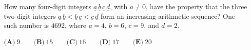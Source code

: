 How many four-digit integers $\underline{a}\,\underline{b}\,\underline{c}\,\underline{d}$, with $a\ne0$, have the property that the three two-digit integers $\underline{a}\,\underline{b}<\underline{b}\,\underline{c}<\underline{c}\,\underline{d}$ form an increasing arithmetic sequence? One such number is $4692$, where $a=4$, $b=6$, $c=9$, and $d=2$.

$\textbf{(A)}\ 9\qquad\textbf{(B)}\ 15\qquad\textbf{(C)}\ 16\qquad\textbf{(D)}\ 17\qquad\textbf{(E)}\ 20$
